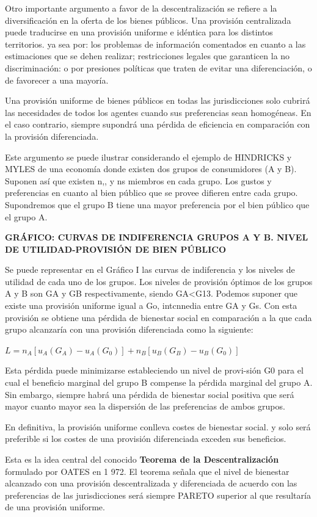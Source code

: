 \documentclass[10pt,a4paper]{article}
\begin{document}
Otro importante argumento a favor de la descentralización se refiere a la diversificación en la oferta de los bienes públicos. Una provisión centralizada puede traducirse en una provisión uniforme e idéntica para los distintos territorios. ya sea por: los problemas de información comentados en cuanto a las estimaciones que se dehen realizar; restricciones legales que garanticen la no discriminación: o por presiones políticas que traten de evitar una diferenciación, o de favorecer a una mayoría.

Una provisión uniforme de bienes públicos en todas las jurisdicciones solo cubrirá las necesidades de todos los agentes cuando sus preferencias sean homogéneas. En el caso contrario, siempre supondrá una pérdida de eficiencia en comparación con la provisión diferenciada.

Este argumento se puede ilustrar considerando el ejemplo de HINDRICKS y MYLES de una economía donde existen dos grupos de consumidores (A y B). Suponen así que existen n,, y ns miembros en cada grupo. Los gustos y preferencias en cuanto al bien público que se provee difieren entre cada grupo. Supondremos que el grupo B tiene una mayor preferencia por el bien público que el grupo A.

\textbf{GRÁFICO: CURVAS DE INDIFERENCIA GRUPOS A Y B. NIVEL DE UTILIDAD-PROVISIÓN DE BIEN PÚBLICO}

Se puede representar en el Gráfico I las curvas de indiferencia y los niveles de utilidad de cada
uno de los grupos.
Los niveles de provisión óptimos de los grupos A y B son GA y GB respectivamente, siendo
GA<G13. Podemos suponer que existe una provisión uniforme igual a Go, intcnnedia entre GA y
Gs. Con esta provisión se obtiene una pérdida de bienestar social en comparación a la que cada
grupo alcanzaría con una provisión diferenciada como la siguiente:

$L=n_A[u_A(G_A)-u_A(G_0)]+n_B[u_B(G_B)-u_B(G_0)]$

Esta pérdida puede minimizarse estableciendo un nivel de provi-sión G0 para el cual el beneficio marginal del grupo B compense la pérdida marginal del grupo A. Sin embargo, siempre habrá una pérdida de bienestar social positiva que será mayor cuanto mayor sea la dispersión de las preferencias de ambos grupos.

En definitiva, la provisión uniforme conlleva costes de bienestar social. y solo será preferible si los costes de una provisión diferenciada exceden sus beneficios.

Esta es la idea central del conocido \textbf{Teorema de la Descentralización} formulado por OATES en 1 972. El teorema señala que el nivel de bienestar alcanzado con una provisión descentralizada y diferenciada de acuerdo con las preferencias de las jurisdicciones será siempre PARETO superior al que resultaría de una provisión uniforme.
\end{document}
